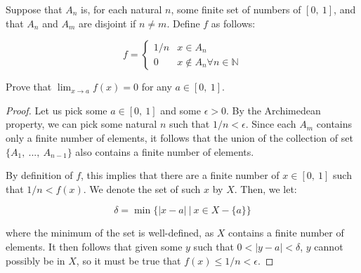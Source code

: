 \documentclass[10pt, oneside]{article}
\newenvironment{problem}[2][Problem]{\begin{trivlist}
\item[\hskip \labelsep {\bfseries #1}\hskip \labelsep {\bfseries #2.}]}{\end{trivlist}}
\begin{document}
    \begin{problem}{5.24}

      Suppose that $A_n$ is, for each natural $n$, some finite set of numbers of $[0, \ 1]$, and
      that $A_n$ and $A_m$ are disjoint if $n \neq m$. Define $f$ as follows:

      $$f = \begin{cases}
        1/n & x \in A_n \\
        0 & x \notin A_n \forall n \in \mathbb{N}
      \end{cases}
      $$

      Prove that $\lim_{x \to a} f(x) = 0$ for any $a \in [0, \ 1]$.

    \end{problem}

    \begin{proof}

      Let us pick some $a \in [0, \ 1]$ and some $\epsilon > 0$. By the Archimedean property, we can pick some natural $n$ such that
      $1/n < \epsilon$. Since each $A_m$ contains only a finite number of elements, it follows that the union of the collection
      of set $\{A_{1}, \ ..., \ A_{n - 1}\}$ also contains a finite number of elements.
      \newline

      By definition of $f$, this implies that there are a finite
      number of $x \in [0, \ 1]$ such that $1/n < f(x)$. We denote the set of such $x$ by $X$. Then, we let:

      $$\delta = \min\{|x - a| \ | \ x \in X - \{a\}\}$$

      where the minimum of the set is well-defined, as $X$ contains a finite number of elements. It then follows that
      given some $y$ such that $0 < |y - a| < \delta$, $y$ cannot possibly be in $X$, so it must be true that $f(x) \leq 1/n < \epsilon$.

      \end{proof}

    
\end{document}
